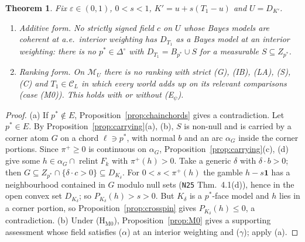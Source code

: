 \documentclass[11pt]{article}
\newtheorem{theorem}{Theorem}[section]
\theoremstyle{definition}
\theoremstyle{remark}
\newcommand{\one}{\mathbf 1}
\newcommand{\Di}{\Delta^{\circ}}
\newcommand{\M}{\mathcal M}
\newcommand{\C}{\mathcal C}
\newcommand{\relint}{\operatorname{relint}}
\newcommand{\src}[1]{\texttt{#1}}
\begin{document}
\begin{theorem}\label{thm:M0closed}
Fix $\varepsilon\in(0,1)$, $0<s<1$, $K'=u+s(T_1-u)$ and $U=D_{K'}$.
\begin{enumerate}[leftmargin=*,label=(\alph*)]
\item \emph{Additive form.} No strictly signed field $c$ on $U$ whose Bayes models are coherent at a.e.\ interior weighting has $D_{T_1}$ as a Bayes model at an interior weighting: there is no $p^*\in\Di$ with $D_{T_1}=B_{p^*}\cup S$ for a measurable $S\subseteq Z_{p^*}$.
\item \emph{Ranking form.} On $\M_U$ there is no ranking with strict (G), (IB), (LA), (S), (C) and $T_1\in\C_L$ in which every world adds up on its relevant comparisons (case (M0)). This holds with or without (E$_\psi$).
\end{enumerate}
\end{theorem}
\begin{proof}
(a) If $p^*\notin E$, Proposition~\ref{prop:chainchords} gives a contradiction. Let $p^*\in E$. By Proposition~\ref{prop:carrying}(a), (b), $S$ is non-null and is carried by a corner atom $G$ on a chord $\ell\ni p^*$, with normal $b$ and an arc $\alpha_G$ inside the corner portions. Since $\pi^+\ge0$ is continuous on $\alpha_G$, Proposition~\ref{prop:carrying}(c), (d) give some $h\in\alpha_G\cap\relint F_k$ with $\pi^+(h)>0$. Take a generic $\delta$ with $\delta\cdot b>0$; then $G\subseteq Z_{p^*}\cap\{\delta\cdot c>0\}\subseteq D_{K_\delta}$. For $0<s<\pi^+(h)$ the gamble $h-s\one$ has a neighbourhood contained in $G$ modulo null sets (\src{N25} Thm.~4.1(d)), hence in the open convex set $D_{K_\delta}$; so $P_{K_\delta}(h)>s>0$. But $K_\delta$ is a $p^*$-face model and $h$ lies in a corner portion, so Proposition~\ref{prop:crosspin} gives $P_{K_\delta}(h)\le0$, a contradiction. (b) Under (H$_{\mathrm{M0}}$), Proposition~\ref{prop:M0} gives a supporting assessment whose field satisfies ($\alpha$) at an interior weighting and ($\gamma$); apply (a).
\end{proof}
\end{document}
